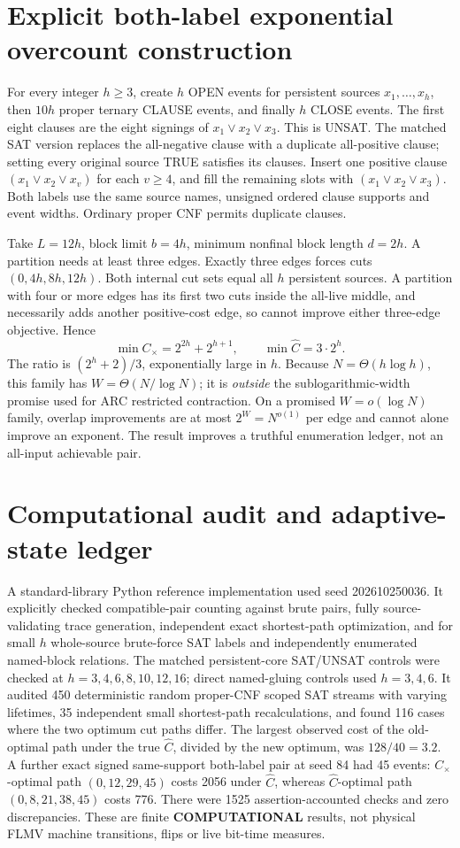 \documentclass[11pt]{article}
\begin{document}
\section{Explicit both-label exponential overcount construction}
For every integer \(h\ge3\), create \(h\) OPEN events for persistent sources \(x_1,\ldots,x_h\), then \(10h\) proper ternary CLAUSE events, and finally \(h\) CLOSE events. The first eight clauses are the eight signings of \(x_1\vee x_2\vee x_3\). This is UNSAT. The matched SAT version replaces the all-negative clause with a duplicate all-positive clause; setting every original source TRUE satisfies its clauses. Insert one positive clause \((x_1\vee x_2\vee x_v)\) for each \(v\ge4\), and fill the remaining slots with \((x_1\vee x_2\vee x_3)\). Both labels use the same source names, unsigned ordered clause supports and event widths. Ordinary proper CNF permits duplicate clauses.

Take \(L=12h\), block limit \(b=4h\), minimum nonfinal block length \(d=2h\). A partition needs at least three edges. Exactly three edges forces cuts \((0,4h,8h,12h)\). Both internal cut sets equal all \(h\) persistent sources. A partition with four or more edges has its first two cuts inside the all-live middle, and necessarily adds another positive-cost edge, so cannot improve either three-edge objective. Hence
\[
 \boxed{\min C_{\times}=2^{2h}+2^{h+1},\qquad
 \min\widehat C=3\cdot 2^h.}
\]
The ratio is \((2^h+2)/3\), exponentially large in \(h\). Because \(N=\Theta(h\log h)\), this family has \(W=\Theta(N/\log N)\); it is \emph{outside} the sublogarithmic-width promise used for ARC restricted contraction. On a promised \(W=o(\log N)\) family, overlap improvements are at most \(2^W=N^{o(1)}\) per edge and cannot alone improve an exponent. The result improves a truthful enumeration ledger, not an all-input achievable pair.

\section{Computational audit and adaptive-state ledger}
A standard-library Python reference implementation used seed 202610250036. It explicitly checked compatible-pair counting against brute pairs, fully source-validating trace generation, independent exact shortest-path optimization, and for small \(h\) whole-source brute-force SAT labels and independently enumerated named-block relations. The matched persistent-core SAT/UNSAT controls were checked at \(h=3,4,6,8,10,12,16\); direct named-gluing controls used \(h=3,4,6\). It audited 450 deterministic random proper-CNF scoped SAT streams with varying lifetimes, 35 independent small shortest-path recalculations, and found 116 cases where the two optimum cut paths differ. The largest observed cost of the old-optimal path under the true \(\widehat C\), divided by the new optimum, was \(128/40=3.2\). A further exact signed same-support both-label pair at seed 84 had 45 events: \(C_\times\)-optimal path \((0,12,29,45)\) costs 2056 under \(\widehat C\), whereas \(\widehat C\)-optimal path \((0,8,21,38,45)\) costs 776. There were 1525 assertion-accounted checks and zero discrepancies. These are finite \textbf{COMPUTATIONAL} results, not physical FLMV machine transitions, flips or live bit-time measures.
\end{document}
